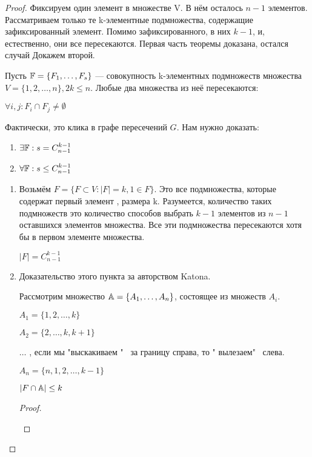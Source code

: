 \begin{proof}

Фиксируем один элемент  в множестве V. В нём осталось $n-1$ элементов. Рассматриваем только те k-элементные подмножества, содержащие зафиксированный элемент. Помимо зафиксированного, в них $k-1$, и, естественно, они все пересекаются.
Первая часть теоремы доказана, остался случай 
Докажем второй.

Пусть $\mathbb{F} = \{ F_1, \dots , F_s\}$ --- совокупность k-элементных подмножеств множества $V=\{1,2,\dots, n\}, 2k \leq n$. Любые два множества из неё пересекаются:

$\forall i,j: F_i \cap F_j \neq \emptyset$

Фактически, это клика в графе пересечений $G$. Нам нужно доказать:
\begin{enumerate}
\item $\exists \mathbb{F} : s = C_{n-1}^{k-1}$

\item $\forall \mathbb{F}: s \leq C^{k-1} _{n-1}$
\end{enumerate}

\begin{enumerate}
\item

Возьмём $F = \{ F \subset   V: |F| = k, 1 \in F \} $. Это все подмножества, которые содержат первый элемент , размера k. Разумеется, количество таких подмножеств это количество способов выбрать $k-1$ элементов из $n-1$ оставшихся элементов множества. Все эти подмножества пересекаются хотя бы в первом элементе множества. 

$|F| = C^{k-1} _{n-1}$

\item Доказательство этого пункта за авторством Katona.

Рассмотрим множество $\mathbb{A} = \{A_1, \dots , A_n\}$, состоящее из множеств $A_i$.

$A_1 = \{1,2, \dots, k\}$

$A_2 = \{2, \dots, k, k+1\}$

$\dots$ , если мы "выскакиваем " \ за границу справа, то " вылезаем"  \ слева.

$A_n = \{n,1,2,\dots, k-1\}$

\begin{alem}[1]
$|F \cap \mathbb{A} | \leq k$
\end{alem}

\begin{proof}~
\begin{itemize}  


\end{itemize}
\end{proof}
\end{enumerate}
\end{proof}
